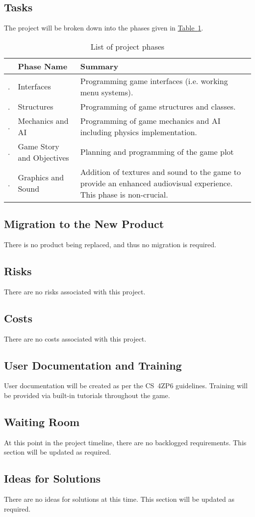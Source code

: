 \documentclass[12pt, titlepage]{article}
\newcounter{PhaseList}
\newcommand{\printPhase}{
    \stepcounter{PhaseList}
    \arabic{PhaseList}.
}
\begin{document}
\subsection{Tasks}
The project will be broken down into the phases given in \hyperref[tab:phases]{Table~\ref*{tab:phases}}.
\begin{table}[h]
\caption{List of project phases} \label{tab:phases}
\begin{tabularx}{\textwidth}{p{0.5cm}>{\raggedright}p{4.5cm}X}
\toprule & {\bf Phase Name} & {\bf Summary}\\
\midrule
\printPhase & Interfaces & Programming game interfaces (i.e. working menu systems).\\
\printPhase & Structures & Programming of game structures and classes.\\
\printPhase & Mechanics and AI & Programming of game mechanics and AI including physics implementation.\\ 
\printPhase & Game Story and Objectives & Planning and programming of the game plot\\
\printPhase & Graphics and Sound & Addition of textures and sound to the game to provide an enhanced audiovisual experience.  This phase is non-crucial. \\
\bottomrule
\end{tabularx}
\end{table}
\subsection{Migration to the New Product}
There is no product being replaced, and thus no migration is required.
\subsection{Risks}
There are no risks associated with this project.
\subsection{Costs}
There are no costs associated with this project.
\subsection{User Documentation and Training}
User documentation will be created as per the CS~4ZP6 guidelines.  Training will be provided via built-in tutorials throughout the game.
\subsection{Waiting Room}
At this point in the project timeline, there are no backlogged requirements.  This section will be updated as required.
\subsection{Ideas for Solutions}
There are no ideas for solutions at this time.  This section will be updated as required.
\end{document}

